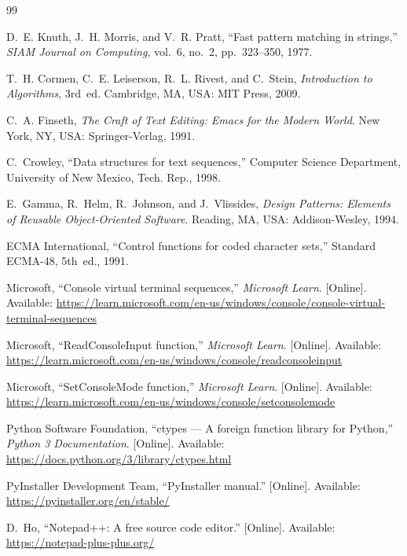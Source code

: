 \documentclass[conference,a4paper]{IEEEtran}
\begin{document}
\begin{thebibliography}{99}

D.~E. Knuth, J.~H. Morris, and V.~R. Pratt, ``Fast pattern matching in strings,'' \textit{SIAM Journal on Computing}, vol.~6, no.~2, pp.~323--350, 1977.

T.~H. Cormen, C.~E. Leiserson, R.~L. Rivest, and C.~Stein, \textit{Introduction to Algorithms}, 3rd~ed. Cambridge, MA, USA: MIT Press, 2009.

C.~A. Finseth, \textit{The Craft of Text Editing: Emacs for the Modern World}. New York, NY, USA: Springer-Verlag, 1991.

C.~Crowley, ``Data structures for text sequences,'' Computer Science Department, University of New Mexico, Tech. Rep., 1998.

E.~Gamma, R.~Helm, R.~Johnson, and J.~Vlissides, \textit{Design Patterns: Elements of Reusable Object-Oriented Software}. Reading, MA, USA: Addison-Wesley, 1994.

ECMA International, ``Control functions for coded character sets,'' Standard ECMA-48, 5th~ed., 1991.

Microsoft, ``Console virtual terminal sequences,'' \textit{Microsoft Learn}. [Online]. Available: \url{https://learn.microsoft.com/en-us/windows/console/console-virtual-terminal-sequences}

Microsoft, ``ReadConsoleInput function,'' \textit{Microsoft Learn}. [Online]. Available: \url{https://learn.microsoft.com/en-us/windows/console/readconsoleinput}

Microsoft, ``SetConsoleMode function,'' \textit{Microsoft Learn}. [Online]. Available: \url{https://learn.microsoft.com/en-us/windows/console/setconsolemode}

Python Software Foundation, ``ctypes --- A foreign function library for Python,'' \textit{Python 3 Documentation}. [Online]. Available: \url{https://docs.python.org/3/library/ctypes.html}

PyInstaller Development Team, ``PyInstaller manual.'' [Online]. Available: \url{https://pyinstaller.org/en/stable/}

D.~Ho, ``Notepad++: A free source code editor.'' [Online]. Available: \url{https://notepad-plus-plus.org/}

\end{thebibliography}
\end{document}
